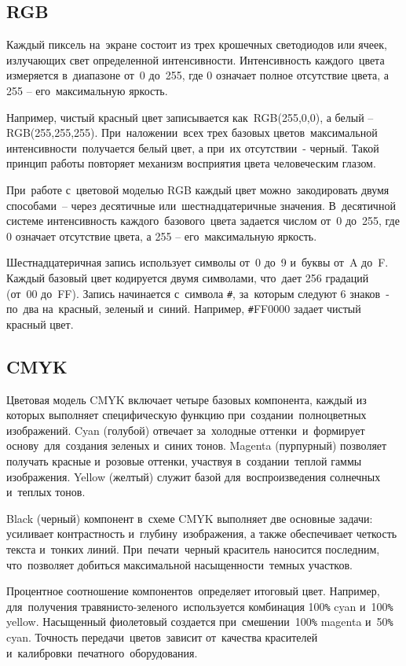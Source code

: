 \documentclass{ou}
\begin{document}
\subsection{RGB}
Каждый пиксель на~экране состоит из трех крошечных светодиодов или ячеек, излучающих свет определенной интенсивности. Интенсивность каждого~цвета измеряется в~диапазоне от~0 до~255, где 0 означает полное отсутствие цвета, а 255 -- его~максимальную яркость. 

Например, чистый красный цвет записывается как~RGB(255,0,0), а белый -- RGB(255,255,255). При~наложении~всех трех базовых цветов~максимальной интенсивности~получается белый цвет, а при~их отсутствии~- черный. Такой принцип работы повторяет механизм восприятия цвета человеческим глазом. 

При~работе с~цветовой моделью RGB каждый цвет можно~закодировать двумя способами~-- через десятичные или~шестнадцатеричные значения. В~десятичной системе интенсивность каждого~базового~цвета задается числом от~0 до~255, где 0 означает отсутствие цвета, а 255 -- его~максимальную яркость.

Шестнадцатеричная запись использует символы от~0 до~9 и~буквы от~A до~F. Каждый базовый цвет кодируется двумя символами, что~дает 256 градаций (от~00 до~FF). Запись начинается с~символа \verb|#|, за~которым следуют 6 знаков~- по~два на~красный, зеленый и~синий. Например, \verb|#|FF0000 задает чистый красный цвет. 
\subsection{CMYK}
Цветовая модель CMYK включает четыре базовых компонента, каждый из которых выполняет специфическую функцию при~создании~полноцветных изображений. Cyan (голубой) отвечает за~холодные оттенки~и~формирует основу~для~создания зеленых и~синих тонов. Magenta (пурпурный) позволяет получать красные и~розовые оттенки, участвуя в~создании~теплой гаммы изображения. Yellow (желтый) служит базой для~воспроизведения солнечных и~теплых тонов.

Black (черный) компонент в~схеме CMYK выполняет две основные задачи: усиливает контрастность и~глубину~изображения, а также обеспечивает четкость текста и~тонких линий. При~печати~черный краситель наносится последним, что~позволяет добиться максимальной насыщенности~темных участков.

Процентное соотношение компонентов~определяет итоговый цвет. Например, для~получения травянисто-зеленого~используется комбинация 100\verb|%| cyan и~100\verb|%| yellow. Насыщенный фиолетовый создается при~смешении~100\verb|%| magenta и~50\verb|%| cyan. Точность передачи~цветов~зависит от~качества красителей и~калибровки~печатного~оборудования. 
\end{document}
